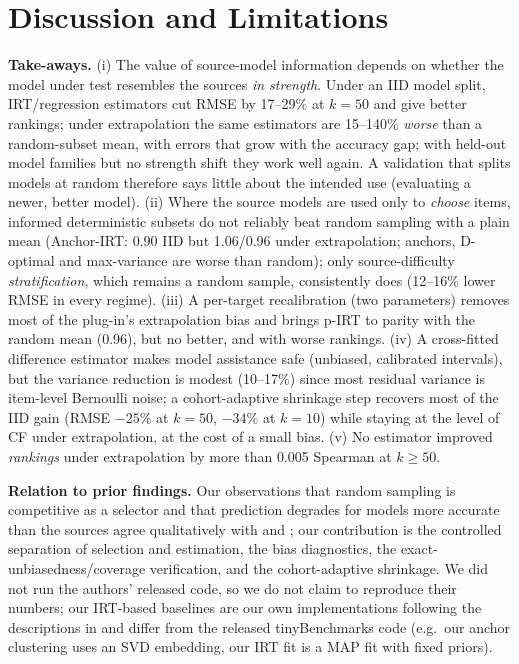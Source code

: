 \section{Discussion and Limitations}
\label{sec:discussion}
\textbf{Take-aways.} (i) The value of source-model information depends on whether the model under test resembles the sources \emph{in strength}. Under an IID model split, IRT/regression estimators cut RMSE by 17--29\% at $k=50$ and give better rankings; under extrapolation the same estimators are 15--140\% \emph{worse} than a random-subset mean, with errors that grow with the accuracy gap; with held-out model families but no strength shift they work well again. A validation that splits models at random therefore says little about the intended use (evaluating a newer, better model). (ii) Where the source models are used only to \emph{choose} items, informed deterministic subsets do not reliably beat random sampling with a plain mean (Anchor-IRT: 0.90 IID but 1.06/0.96 under extrapolation; anchors, D-optimal and max-variance are worse than random); only source-difficulty \emph{stratification}, which remains a random sample, consistently does (12--16\% lower RMSE in every regime). (iii) A per-target recalibration (two parameters) removes most of the plug-in's extrapolation bias and brings p-IRT to parity with the random mean (0.96), but no better, and with worse rankings. (iv) A cross-fitted difference estimator makes model assistance safe (unbiased, calibrated intervals), but the variance reduction is modest (10--17\%) since most residual variance is item-level Bernoulli noise; a cohort-adaptive shrinkage step recovers most of the IID gain (RMSE $-25\%$ at $k=50$, $-34\%$ at $k=10$) while staying at the level of CF under extrapolation, at the cost of a small bias. (v) No estimator improved \emph{rankings} under extrapolation by more than 0.005 Spearman at $k\ge50$.

\textbf{Relation to prior findings.} Our observations that random sampling is competitive as a selector and that prediction degrades for models more accurate than the sources agree qualitatively with \citet{pacchiardi2024100} and \citet{zhang2025benchmark}; our contribution is the controlled separation of selection and estimation, the bias diagnostics, the exact-unbiasedness/coverage verification, and the cohort-adaptive shrinkage. We did not run the authors' released code, so we do not claim to reproduce their numbers; our IRT-based baselines are our own implementations following the descriptions in \citet{maiapolo2024tiny} and differ from the released tinyBenchmarks code (e.g.\ our anchor clustering uses an SVD embedding, our IRT fit is a MAP fit with fixed priors).

